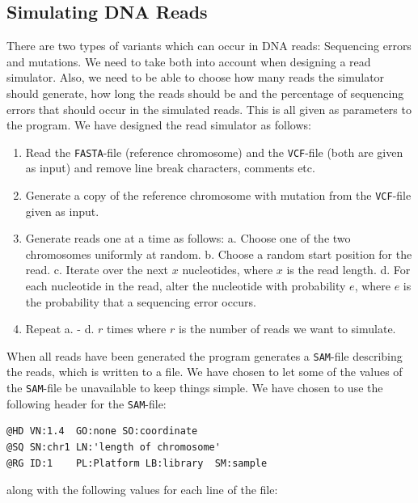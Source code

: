 \documentclass[10pt,a4paper]{article}
\begin{document}
\subsection{Simulating DNA Reads}
There are two types of variants which can occur in DNA reads: Sequencing errors and mutations. We need to take both into account when designing a read simulator. Also, we need to be able to choose how many reads the simulator should generate, how long the reads should be and the percentage of sequencing errors that should occur in the simulated reads. This is all given as parameters to the program. We have designed the read simulator as follows:
\begin{enumerate}
\item Read the \texttt{FASTA}-file (reference chromosome) and the \texttt{VCF}-file (both are given as input) and remove line break characters, comments etc.
\item Generate a copy of the reference chromosome with mutation from the \texttt{VCF}-file given as input.
\item Generate reads one at a time as follows:
\subitem a. Choose one of the two chromosomes uniformly at random.
\subitem b. Choose a random start position for the read.
\subitem c. Iterate over the next $x$ nucleotides, where $x$ is the read length.
\subitem d. For each nucleotide in the read, alter the nucleotide with probability $e$, where $e$ is the probability that a sequencing error occurs.
\item Repeat a. - d.  $r$ times where $r$ is the number of reads we want to simulate.
\end{enumerate}
When all reads have been generated the program generates a \texttt{SAM}-file describing the reads, which is written to a file. We have chosen to let some of the values of the \texttt{SAM}-file be unavailable to keep things simple. We have chosen to use the following header for the \texttt{SAM}-file:
\begin{lstlisting}
@HD	VN:1.4	GO:none	SO:coordinate
@SQ	SN:chr1	LN:'length of chromosome'
@RG	ID:1	PL:Platform	LB:library	SM:sample
\end{lstlisting}
along with the following values for each line of the file:
\end{document}
